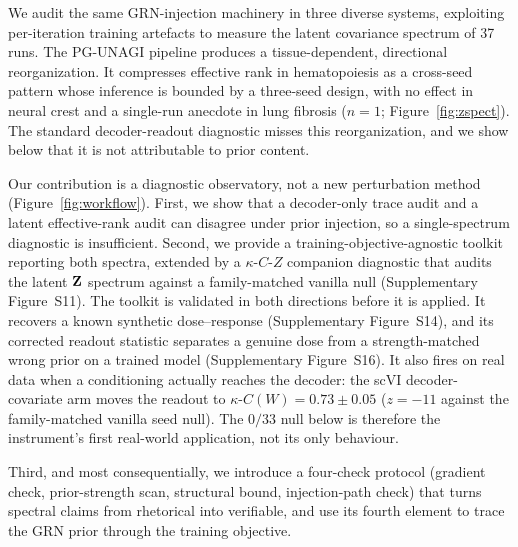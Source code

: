 \documentclass[11pt,a4paper]{article}
\begin{document}
We audit the same GRN-injection machinery in three diverse systems, exploiting per-iteration training artefacts to measure the latent covariance spectrum of 37 runs. The PG-UNAGI pipeline produces a tissue-dependent, directional reorganization. It compresses effective rank in hematopoiesis as a cross-seed pattern whose inference is bounded by a three-seed design, with no effect in neural crest and a single-run anecdote in lung fibrosis ($n=1$; Figure~\ref{fig:zspect}). The standard decoder-readout diagnostic misses this reorganization, and we show below that it is not attributable to prior content.

Our contribution is a diagnostic observatory, not a new perturbation method (Figure~\ref{fig:workflow}). First, we show that a decoder-only trace audit and a latent effective-rank audit can disagree under prior injection, so a single-spectrum diagnostic is insufficient. Second, we provide a training-objective-agnostic toolkit reporting both spectra, extended by a $\kappa$-$C$-$Z$ companion diagnostic that audits the latent $\mathbf{Z}$ spectrum against a family-matched vanilla null (Supplementary Figure~S11). The toolkit is validated in both directions before it is applied. It recovers a known synthetic dose--response (Supplementary Figure~S14), and its corrected readout statistic separates a genuine dose from a strength-matched wrong prior on a trained model (Supplementary Figure~S16). It also fires on real data when a conditioning actually reaches the decoder: the scVI decoder-covariate arm moves the readout to $\kappa$-$C(W)=0.73\pm0.05$ ($z=-11$ against the family-matched vanilla seed null). The $0/33$ null below is therefore the instrument's first real-world application, not its only behaviour.

 Third, and most consequentially, we introduce a four-check protocol (gradient check, prior-strength scan, structural bound, injection-path check) that turns spectral claims from rhetorical into verifiable, and use its fourth element to trace the GRN prior through the training objective.
\end{document}
